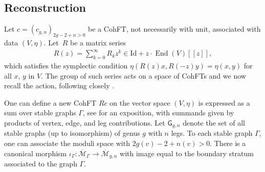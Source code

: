 \documentclass[pdftex]{sigma}
\def\oM{\overline{\mathcal{M}}}
\def\n{\mathrm{n}}
\def\V{\mathrm{V}}
\def\g{\mathrm{g}}
\def\rarr{\rightarrow}
\numberwithin{equation}{section}
\begin{document}
\subsection{Reconstruction}\label{GTC}
Let $c=(c_{g, n})_{2g-2+n>0}$ be a CohFT, not necessarily with unit,
associated with data $(V, \eta)$.
Let~$R$ be a matrix series
\begin{align*}
R(z)= \sum_{k=0}^\infty R_k z^k
\in \mathrm{Id} +z\cdot \operatorname{End}(V)[[z]],
\end{align*}
which satisfies the symplectic condition
$\eta(R(z)x,R(-z)y)=\eta(x,y)$
for all $x$, $y$ in $V$. The group of such series acts on a space of CohFTs and we now recall the action, following closely \cite[Section~1.2.1]{PPP}.

One can define a
 new CohFT $Rc$
on the vector space $(V, \eta)$ is expressed as a sum over stable graphs $\Gamma$, see \cite[Section 0.2]{PPZ} for an exposition,
with summands given by
 products of vertex, edge, and leg contributions. Let $\mathsf{G}_{g,n}$ denote the set of all stable graphs
(up to isomorphism) of genus $g$ with $n$ legs. To each stable graph $\Gamma$, one can associate the moduli space
\smash{$
\oM_\Gamma =\prod_{v\in \V} \oM_{\g(v),\n(v)}
$}
with $2g(v)-2+n(v)>0$.
 There is a
canonical morphism
$\iota_{\Gamma}\colon \oM_{\Gamma} \rarr \oM_{g,n}$
 with image equal to the boundary stratum
associated to the graph $\Gamma$.
\end{document}
